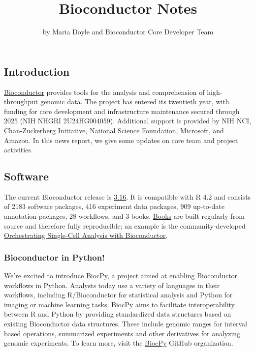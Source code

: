 \title{Bioconductor Notes}
\author{by Maria Doyle and Bioconductor Core Developer Team}

\maketitle


\hypertarget{introduction}{%
\subsection{Introduction}\label{introduction}}

\href{https://bioconductor.org}{Bioconductor} provides
tools for the analysis and comprehension of high-throughput genomic
data. The project has entered its twentieth year, with funding
for core development and infrastructure maintenance secured
through 2025 (NIH NHGRI 2U24HG004059). Additional support is provided
by NIH NCI, Chan-Zuckerberg Initiative, National Science Foundation,
Microsoft, and Amazon. In this news report, we give some updates on
core team and project activities.

\hypertarget{software}{%
\subsection{Software}\label{software}}

The current Bioconductor release is \href{https://bioconductor.org/news/bioc_3_16_release/}{3.16}. It is
compatible with R 4.2 and consists of 2183 software packages, 416
experiment data packages, 909 up-to-date annotation packages, 28
workflows, and 3 books. \href{https://bioconductor.org/books/release/}{Books} are
built regularly from source and therefore fully
reproducible; an example is the
community-developed \href{https://bioconductor.org/books/release/OSCA/}{Orchestrating Single-Cell Analysis with Bioconductor}.

\hypertarget{bioconductor-in-python}{%
\subsubsection{Bioconductor in Python!}\label{bioconductor-in-python}}

We're excited to introduce \href{https://www.github.com/biocpy}{BiocPy}, a project aimed at enabling Bioconductor workflows in Python. Analysts today use a variety of languages in their workflows, including R/Bioconductor for statistical analysis and Python for imaging or machine learning tasks. BiocPy aims to facilitate interoperability between R and Python by providing standardized data structures based on existing Bioconductor data structures. These include genomic ranges for interval based operations, summarized experiments and other derivatives for analyzing genomic experiments. To learn more, visit the \href{https://github.com/biocpy}{BiocPy} GitHub organization.

